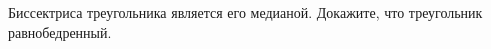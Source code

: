 \begin{ex}
	\begin{condition}
		Биссектриса треугольника является его медианой. Докажите, что треугольник равнобедренный.
	\end{condition}
\end{ex}
